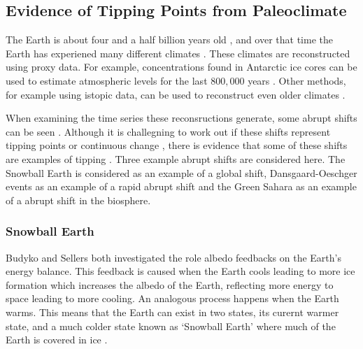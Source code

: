 \subsection{Evidence of Tipping Points from Paleoclimate}
The Earth is about four and a half billion years old \parencite{Dalrymple2001}, and over that time the Earth has experiened many different climates \parencite{Alley2003}.
These climates are reconstructed using proxy data. For example,  concentrations found in Antarctic ice cores can be used to estimate atmospheric  levels for the
last $800,000$ years \parencite{Bereiter2014}. Other methods, for example using istopic data, can be used to reconstruct even older climates \parencite{Tierney2020}.

When examining the time series these reconsructions generate, some abrupt shifts can be seen \parencite{Boers2022,Brovkin2021}. Although it is challegning to work out if these
shifts represent tipping points or continuous change \parencite{Brovkin2008}, there is evidence that some of these shifts are examples of tipping \parencite{Dakos2008}. Three example abrupt shifts are considered here.
The Snowball Earth is considered as an example of a global shift, Dansgaard-Oeschger events as an example of a rapid abrupt shift and the Green Sahara as an example of a abrupt shift in
the biosphere.

\subsubsection{Snowball Earth}
Budyko and Sellers \parencite{Budyko1969,Sellers1969} both investigated the role albedo feedbacks on the Earth's energy balance. This feedback is caused when the Earth cools leading to more
ice formation which increases the albedo of the Earth, reflecting more energy to space leading to more cooling. An analogous process happens when the Earth warms. This means that the
Earth can exist in two states, its curernt warmer state, and a much colder state known as `Snowball Earth' where much of the Earth is covered in ice \parencite{Ghil1976,Held1974}. 

